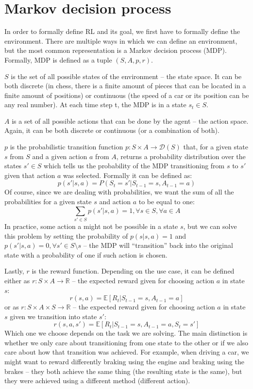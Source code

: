 \documentclass[
  digital,     %
  oneside,     %
  nosansbold,  %
  nocolorbold, %
  lof,         %
  lot,         %
]{fithesis4}
\begin{document}
\section{Markov decision process}
In order to formally define RL and its goal, we first have to formally define the environment. There are multiple ways in which we can define an environment, but the most common representation is a Markov decision process (MDP). Formally, MDP is defined as a tuple $(S, A, p, r)$.

$S$ is the set of all possible states of the environment -- the state space. It can be both discrete (in chess, there is a finite amount of pieces that can be located in a finite amount of positions) or continuous (the speed of a car or its position can be any real number).  At each time step t, the MDP is in a state $s_t\in S$.

$A$ is a set of all possible actions that can be done by the agent -- the action space. Again, it can be both discrete or continuous (or a combination of both).

$p$ is the probabilistic transition function $p\colon S \times A \to \mathcal{D}(S)$ that, for a given state $s$ from $S$ and a given action $a$ from $A$, returns a probability distribution over the states $s'\in S$ which tells us the probability of the MDP transitioning from $s$ to $s'$ given that action $a$ was selected. Formally it can be defined as:
\[
p(s'|s,a)=P(S_t=s'|S_{t-1}=s,A_{t-1}=a)
\]
Of course, since we are dealing with probabilities, we want the sum of all the probabilities for a given state $s$ and action $a$ to be equal to one:
\[
\sum_{s'\in S} p(s'|s,a)=1, \forall s \in S, \forall a \in A
\]
In practice, some action a might not be possible in a state $s$, but we can solve this problem by setting the probability of $p(s|s, a) = 1$ and $p(s' | s, a) = 0, \forall s'\in S \setminus s$ -- the MDP will \enquote{transition} back into the original state with a probability of one if such action is chosen.

Lastly, $r$ is the reward function. Depending on the use case, it can be defined either as $r\colon S \times A \to \mathbb{R}$ -- the expected reward given for choosing action $a$ in state $s$:
\[
r(s,a)= \mathbb{E} [R_t|S_{t-1}=s, A_{t-1}=a]
\]
\cite[p. 17, p. 54]{PA230, GDRL} or as $r\colon S\times A \times S \to \mathbb{R}$ -- the expected reward given for choosing action $a$ in state $s$ given we transition into state $s'$:
\[
r(s, a, s')= \mathbb{E} [R_t|S_{t-1}=s, A_{t-1}=a, S_t=s']
\]
\cite[p. 54]{GDRL}
Which one we choose depends on the task we are solving. The main distinction is whether we only care about transitioning from one state to the other or if we also care about how that transition was achieved. For example, when driving a car, we might want to reward differently braking using the engine and braking using the brakes -- they both achieve the same thing (the resulting state is the same), but they were achieved using a different method (different action).
\end{document}
